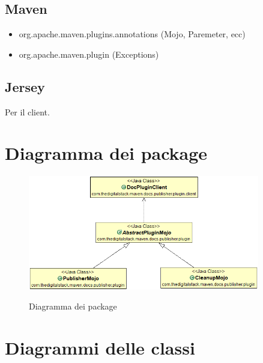 \subsection*{Maven}
\begin{itemize}
    \item org.apache.maven.plugins.annotations (Mojo, Paremeter, ecc)
    \item org.apache.maven.plugin (Exceptions)
\end{itemize}

\subsection*{Jersey}
Per il client.


\section{Diagramma dei package} %
\label{sec:diagramma-package}
\begin{figure}[H]
    \centering
    \includegraphics[width=0.9\textwidth]{immagini/PackageDiagram.png}\\
    \caption{Diagramma dei package}
\end{figure}

\section{Diagrammi delle classi}
\label{sec:diagrammi-classi}

